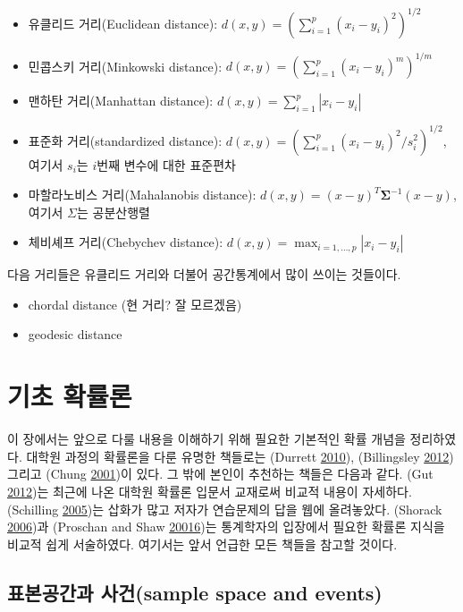 \documentclass[b5paper,]{book}
\theoremstyle{definition}
\theoremstyle{definition}
\theoremstyle{definition}
\theoremstyle{remark}
\begin{document}
\begin{itemize}
\item
  유클리드 거리(Euclidean distance):
  \(d(x,y)=(\sum_{i=1}^{p}(x_{i}-y_{i})^{2})^{1/2}\)
\item
  민콥스키 거리(Minkowski distance):
  \(d(x,y)=(\sum_{i=1}^{p}(x_{i}-y_{i})^{m})^{1/m}\)
\item
  맨하탄 거리(Manhattan distance):
  \(d(x,y)=\sum_{i=1}^{p}|x_{i}-y_{i}|\)
\item
  표준화 거리(standardized distance):
  \(d(x,y)=(\sum_{i=1}^{p}(x_{i}-y_{i})^{2}/s_{i}^{2})^{1/2}\), 여기서
  \(s_{i}\)는 \(i\)번째 변수에 대한 표준편차
\item
  마할라노비스 거리(Mahalanobis distance):
  \(d(x,y)=(x-y)^{T}\boldsymbol{\Sigma}^{-1}(x-y)\), 여기서 \(\Sigma\)는
  공분산행렬
\item
  체비셰프 거리(Chebychev distance):
  \(d(x,y)=\max_{i=1,\ldots ,p}|x_{i}-y_{i}|\)
\end{itemize}

다음 거리들은 유클리드 거리와 더불어 공간통계에서 많이 쓰이는 것들이다.

\begin{itemize}
\item
  chordal distance (현 거리? 잘 모르겠음)
\item
  geodesic distance
\end{itemize}

\chapter{기초 확률론}\label{basicprob}

이 장에서는 앞으로 다룰 내용을 이해하기 위해 필요한 기본적인 확률 개념을
정리하였다. 대학원 과정의 확률론을 다룬 유명한 책들로는 (Durrett
\protect\hyperlink{ref-Durrett2010}{2010}), (Billingsley
\protect\hyperlink{ref-Billingsley2012}{2012}) 그리고 (Chung
\protect\hyperlink{ref-Chung2001}{2001})이 있다. 그 밖에 본인이 추천하는
책들은 다음과 같다. (Gut \protect\hyperlink{ref-Gut2012}{2012})는 최근에
나온 대학원 확률론 입문서 교재로써 비교적 내용이 자세하다. (Schilling
\protect\hyperlink{ref-Schilling2005}{2005})는 삽화가 많고 저자가
연습문제의 답을 웹에 올려놓았다. (Shorack
\protect\hyperlink{ref-Shorack2006}{2006})과 (Proschan and Shaw
\protect\hyperlink{ref-Proschan2016}{20016})는 통계학자의 입장에서
필요한 확률론 지식을 비교적 쉽게 서술하였다. 여기서는 앞서 언급한 모든
책들을 참고할 것이다.

\section{표본공간과 사건(sample space and
events)}\label{-sample-space-and-events}
\end{document}

